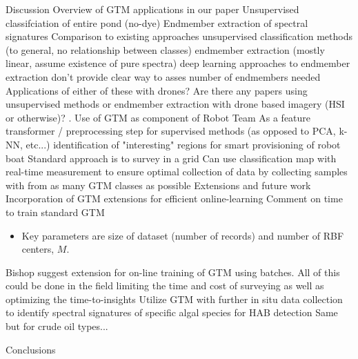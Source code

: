 \documentclass{article}
\begin{document}
\begin{outline}[enumerate]
\1 Discussion
    \2 Overview of GTM applications in our paper
        \3 Unsupervised classifciation of entire pond (no-dye)
        \3 Endmember extraction of spectral signatures
    \2 Comparison to existing approaches
        \3 unsupervised classification methods (to general, no relationship between classes) 
        \3 endmember extraction (mostly linear, assume existence of pure spectra)
        \3 deep learning approaches to endmember extraction don't provide clear way to asses number of endmembers needed
    \2 Applications of either of these with drones?
        \3 Are there any papers using unsupervised methods or endmember extraction with drone based imagery (HSI or otherwise)?
    \2. Use of GTM as component of Robot Team
        \3 As a feature transformer / preprocessing step for supervised methods (as opposed to PCA, k-NN, etc...)
        \3 identification of "interesting" regions for smart provisioning of robot boat
            \4 Standard approach is to survey in a grid
            \4 Can use classification map with real-time measurement to ensure optimal collection of data by collecting samples with from as many GTM classes as possible
    \2 Extensions and future work
        \3 Incorporation of GTM extensions for efficient online-learning
            \4 Comment on time to train standard GTM
                \begin{itemize}
                    \item Key parameters are size of dataset (number of records) and number of RBF centers, $M$.
                \end{itemize}
            \4 Bishop suggest extension for on-line training of GTM using batches.
            \4 All of this could be done in the field limiting the time and cost of surveying as well as optimizing the time-to-insights
        \3 Utilize GTM with further in situ data collection to identify spectral signatures of specific algal species for HAB detection
        \3 Same but for crude oil types...

\1 Conclusions




\end{outline}



\end{document}
